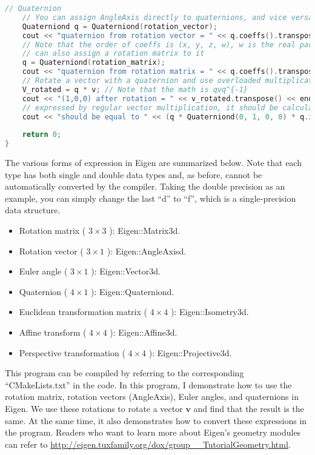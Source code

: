 \begin{lstlisting}[language=c++,caption=slambook2/ch3/useGeometry/useGeometry.cpp]
	// Quaternion
	// You can assign AngleAxis directly to quaternions, and vice versa
	Quaterniond q = Quaterniond(rotation_vector);
	cout << "quaternion from rotation vector = " << q.coeffs().transpose() << endl; 
	// Note that the order of coeffs is (x, y, z, w), w is the real part, the first three are the imaginary part
	// can also assign a rotation matrix to it
	q = Quaterniond(rotation_matrix);
	cout << "quaternion from rotation matrix = " << q.coeffs().transpose() << endl;
	// Rotate a vector with a quaternion and use overloaded multiplication
	V_rotated = q * v; // Note that the math is qvq^{-1}
	cout << "(1,0,0) after rotation = " << v_rotated.transpose() << endl;
	// expressed by regular vector multiplication, it should be calculated as follows
	cout << "should be equal to " << (q * Quaterniond(0, 1, 0, 0) * q.inverse()).coeffs().transpose() << endl;
	
	return 0;
}
\end{lstlisting}

The various forms of expression in Eigen are summarized below. Note that each type has both single and double data types and, as before, cannot be automatically converted by the compiler. Taking the double precision as an example, you can simply change the last ``d'' to ``f'', which is a single-precision data structure.
\begin{itemize}
	\item Rotation matrix ( $ 3  \times  3 $ ): Eigen::Matrix3d.
	\item Rotation vector ( $ 3  \times  1 $ ): Eigen::AngleAxisd.
	\item Euler angle ( $ 3  \times  1 $ ): Eigen::Vector3d.
	\item Quaternion ( $ 4  \times  1 $ ): Eigen::Quaterniond.
	\item Euclidean transformation matrix ( $ 4  \times  4 $ ): Eigen::Isometry3d.
	\item Affine transform ( $ 4  \times  4 $ ): Eigen::Affine3d.
	\item Perspective transformation ( $ 4  \times  4 $ ): Eigen::Projective3d.
\end{itemize}

This program can be compiled by referring to the corresponding ``CMakeLists.txt'' in the code. In this program, I demonstrate how to use the rotation matrix, rotation vectors (AngleAxis), Euler angles, and quaternions in Eigen. We use these rotations to rotate a vector $ \mathbf {v} $ and find that the result is the same. At the same time, it also demonstrates how to convert these expressions in the program. Readers who want to learn more about Eigen's geometry modules can refer to \url {http://eigen.tuxfamily.org/dox/group__TutorialGeometry.html}.


